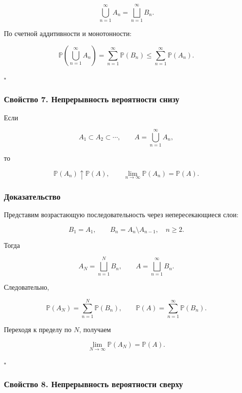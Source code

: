 \documentclass[
  11pt,
  a4paper,
]{article}
\begin{document}
\[
\bigcup_{n=1}^{\infty}A_n
=
\bigsqcup_{n=1}^{\infty}B_n.
\]

По счетной аддитивности и монотонности:

\[
\mathbb P\left(\bigcup_{n=1}^{\infty}A_n\right)
=
\sum_{n=1}^{\infty}\mathbb P(B_n)
\le
\sum_{n=1}^{\infty}\mathbb P(A_n).
\]

\(\square\)

\subsubsection{Свойство 7. Непрерывность вероятности
снизу}\label{ux441ux432ux43eux439ux441ux442ux432ux43e-7.-ux43dux435ux43fux440ux435ux440ux44bux432ux43dux43eux441ux442ux44c-ux432ux435ux440ux43eux44fux442ux43dux43eux441ux442ux438-ux441ux43dux438ux437ux443}

Если

\[
A_1\subset A_2\subset\cdots,
\qquad
A=\bigcup_{n=1}^{\infty}A_n,
\]

то

\[
\mathbb P(A_n)\uparrow\mathbb P(A),
\qquad
\lim_{n\to\infty}\mathbb P(A_n)=\mathbb P(A).
\]

\subsubsection{Доказательство}\label{ux434ux43eux43aux430ux437ux430ux442ux435ux43bux44cux441ux442ux432ux43e-6}

Представим возрастающую последовательность через непересекающиеся слои:

\[
B_1=A_1,\qquad
B_n=A_n\setminus A_{n-1},\quad n\ge2.
\]

Тогда

\[
A_N=\bigsqcup_{n=1}^{N}B_n,
\qquad
A=\bigsqcup_{n=1}^{\infty}B_n.
\]

Следовательно,

\[
\mathbb P(A_N)=\sum_{n=1}^{N}\mathbb P(B_n),
\qquad
\mathbb P(A)=\sum_{n=1}^{\infty}\mathbb P(B_n).
\]

Переходя к пределу по \(N\), получаем

\[
\lim_{N\to\infty}\mathbb P(A_N)
=
\mathbb P(A).
\]

\(\square\)

\subsubsection{Свойство 8. Непрерывность вероятности
сверху}\label{ux441ux432ux43eux439ux441ux442ux432ux43e-8.-ux43dux435ux43fux440ux435ux440ux44bux432ux43dux43eux441ux442ux44c-ux432ux435ux440ux43eux44fux442ux43dux43eux441ux442ux438-ux441ux432ux435ux440ux445ux443}
\end{document}
